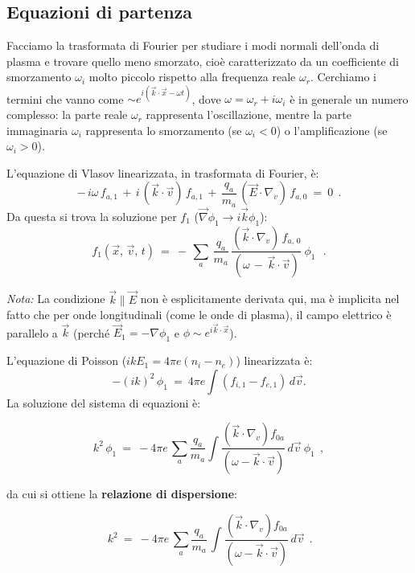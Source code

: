 %
%
%
\subsection{Equazioni di partenza}

Facciamo la trasformata di Fourier per studiare i modi normali dell'onda di plasma e trovare quello meno smorzato, cioè caratterizzato da un coefficiente di smorzamento \(\omega_i\) molto piccolo rispetto alla frequenza reale \(\omega_r\).
Cerchiamo i termini che vanno come $\sim e^{i(\vec k \cdot \vec x - \omega t)}$, dove  \(\boxed{\omega = \omega_r + i\omega_i}\)  è in generale un numero complesso: la parte reale \(\omega_r\) rappresenta l'oscillazione, mentre la parte immaginaria \(\omega_i\) rappresenta lo smorzamento (se \(\omega_i < 0\)) o l'amplificazione (se \(\omega_i > 0\)).

L'equazione di Vlasov linearizzata, in trasformata di Fourier, è:
\[
-\,i\omega\, f_{a,1}\, +\, i\,(\vec{k} \cdot \vec{v})\, f_{a,1}\, +\, \frac{q_a}{m_a}\, (\vec{E} \cdot \nabla_v)\, f_{a,0}\ =\ 0\ \ .
\]
Da questa si trova la soluzione per \(f_1\) ($\vec \nabla \phi_1 \rightarrow i\vec k \phi_1$):
\[
f_{1}(\vec x,\, \vec v,\, t)\ =\ -\,\sum_a\, \frac{q_a}{m_a}\, \frac{(\vec{k} \cdot \nabla_v)\, f_{a,\, 0}}{(\omega\, -\, \vec{k} \cdot \vec{v})}\ \phi_1\ \ \ .
\]

\emph{Nota:} La condizione \(\vec{k} \parallel \vec{E}\) non è esplicitamente derivata qui, ma è implicita nel fatto che per onde longitudinali (come le onde di plasma), il campo elettrico è parallelo a \(\vec{k}\) (perché \(\vec{E}_1 = -\nabla \phi_1\) e \(\phi \sim e^{i\vec{k} \cdot \vec{x}}\)).

L'equazione di Poisson ($ikE_1=4\pi e (n_i - n_e)$) linearizzata è:
\[
-(ik)^2\, \phi_1\ =\ 4\pi e \int (f_{i,1} - f_{e,1})\, d\vec{v}.
\]
La soluzione del sistema di equazioni è:

\begin{equation}
	\label{LD soluzione}
	k^2\, \phi_1\ =\ -4\pi e\, \sum_a \frac{q_a}{m_a} \int \frac{(\vec{k} \cdot \nabla_v) f_{0a}}{(\omega - \vec{k} \cdot \vec{v})}\, d\vec{v} \
	\phi_1\ \ ,
\end{equation}

da cui si ottiene la \textbf{relazione di dispersione}:

\begin{equation}
	\label{LD dispersion 1}
	\boxed{\, k^2\ =\ -4\pi e\, \sum_a \frac{q_a}{m_a}\, \int \frac{(\vec{k} \cdot \nabla_v) f_{0a}}{(\omega - \vec{k} \cdot \vec{v})}\, d\vec{v}\ \ .}
\end{equation}




